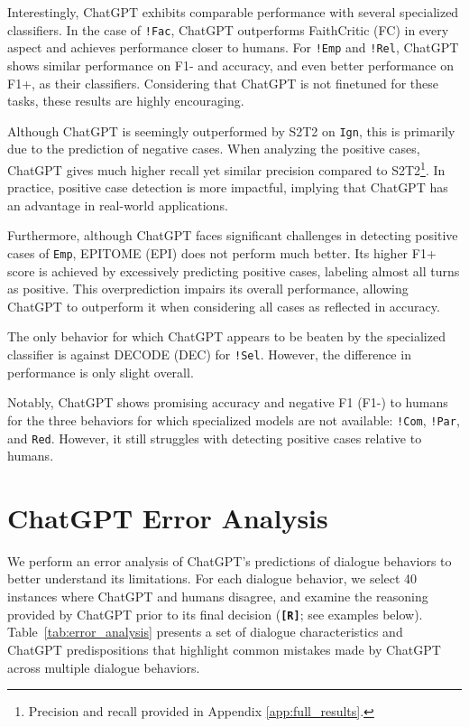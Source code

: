 Interestingly, ChatGPT exhibits comparable performance with several specialized classifiers. In the case of \texttt{!Fac}, ChatGPT outperforms FaithCritic (FC) in every aspect and achieves performance closer to humans. For \texttt{!Emp} and \texttt{!Rel}, ChatGPT shows similar performance on F1- and accuracy, and even better performance on F1+, as their classifiers. Considering that ChatGPT is not finetuned for these tasks, these results are highly encouraging.

Although ChatGPT is seemingly outperformed by S2T2 on \texttt{Ign}, this is primarily due to the prediction of negative cases. When analyzing the positive cases, ChatGPT gives much higher recall yet similar precision compared to S2T2\footnote{Precision and recall provided in Appendix \ref{app:full_results}.}.
In practice, positive case detection is more impactful, implying that ChatGPT has an advantage in real-world applications.

Furthermore, although ChatGPT faces significant challenges in detecting positive cases of \texttt{Emp}, EPITOME (EPI) does not perform much better. Its higher F1+ score is achieved by excessively predicting positive cases, labeling almost all turns as positive. This overprediction impairs its overall performance, allowing ChatGPT to outperform it when considering all cases as reflected in accuracy.

The only behavior for which ChatGPT appears to be beaten by the specialized classifier is against DECODE (DEC) for \texttt{!Sel}. However, the difference in performance is only slight overall. 

Notably, ChatGPT shows promising accuracy and negative F1 (F1-) to humans for the three behaviors for which specialized models are not available: \texttt{!Com}, \texttt{!Par}, and \texttt{Red}.
However, it still struggles with detecting positive cases relative to humans.

\section{ChatGPT Error Analysis}
\label{sec:gpt_error_analysis}

We perform an error analysis of ChatGPT's predictions of dialogue behaviors to better understand its limitations. For each dialogue behavior, we select 40 instances where ChatGPT and humans disagree, and examine the reasoning provided by ChatGPT prior to its final decision (\textbf{\texttt{[R]}}; see examples below).
Table~\ref{tab:error_analysis} presents a set of dialogue characteristics and ChatGPT predispositions that highlight common mistakes made by ChatGPT across multiple dialogue behaviors.

